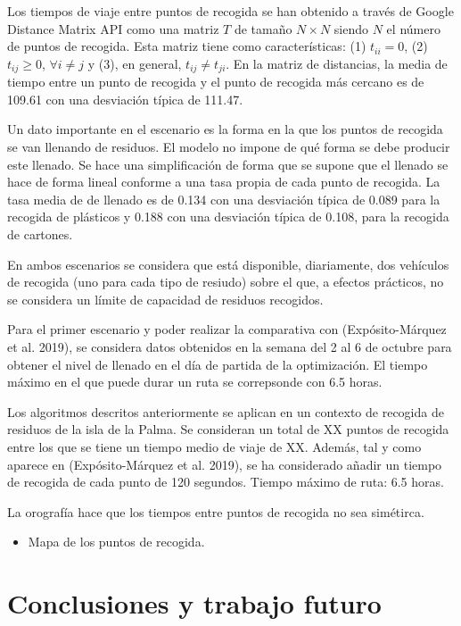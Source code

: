 \documentclass[
]{article}
\providecommand{\tightlist}{%
  \setlength{\itemsep}{0pt}\setlength{\parskip}{0pt}}
\begin{document}
Los tiempos de viaje entre puntos de recogida se han obtenido a través
de Google Distance Matrix API como una matriz \(T\) de tamaño
\(N\times N\) siendo \(N\) el número de puntos de recogida. Esta matriz
tiene como características: (1) \(t_{ii} = 0\), (2) \(t_{ij} \geq 0\),
\(\forall i\neq j\) y (3), en general, \(t_{ij}\neq t_{ji}\). En la
matriz de distancias, la media de tiempo entre un punto de recogida y el
punto de recogida más cercano es de 109.61 con una desviación típica de
111.47.

Un dato importante en el escenario es la forma en la que los puntos de
recogida se van llenando de residuos. El modelo no impone de qué forma
se debe producir este llenado. Se hace una simplificación de forma que
se supone que el llenado se hace de forma lineal conforme a una tasa
propia de cada punto de recogida. La tasa media de de llenado es de
0.134 con una desviación típica de 0.089 para la recogida de plásticos y
0.188 con una desviación típica de 0.108, para la recogida de cartones.

En ambos escenarios se considera que está disponible, diariamente, dos
vehículos de recogida (uno para cada tipo de resiudo) sobre el que, a
efectos prácticos, no se considera un límite de capacidad de residuos
recogidos.

Para el primer escenario y poder realizar la comparativa con
(Expósito-Márquez et al. 2019), se considera datos obtenidos en la
semana del 2 al 6 de octubre para obtener el nivel de llenado en el día
de partida de la optimización. El tiempo máximo en el que puede durar un
ruta se correpsonde con 6.5 horas.

Los algoritmos descritos anteriormente se aplican en un contexto de
recogida de residuos de la isla de la Palma. Se consideran un total de
XX puntos de recogida entre los que se tiene un tiempo medio de viaje de
XX. Además, tal y como aparece en (Expósito-Márquez et al. 2019), se ha
considerado añadir un tiempo de recogida de cada punto de 120 segundos.
Tiempo máximo de ruta: 6.5 horas.

La orografía hace que los tiempos entre puntos de recogida no sea
simétirca.

\begin{itemize}
\tightlist
\item
  Mapa de los puntos de recogida.
\end{itemize}

\hypertarget{conclusiones-y-trabajo-futuro}{%
\section*{Conclusiones y trabajo
futuro}\label{conclusiones-y-trabajo-futuro}}
\end{document}
